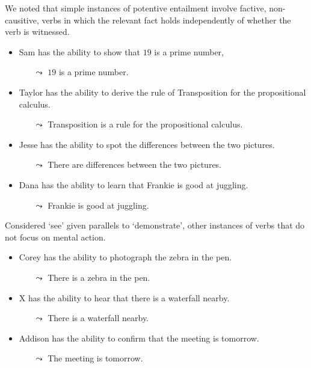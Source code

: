 \begin{note}[Examples]
  We noted that simple instances of potentive entailment involve factive, non-causitive, verbs in which the relevant fact holds independently of whether the verb is witnessed.
  \begin{itemize}
  \item Sam has the ability to show that \(19\) is a prime number,
    \begin{itemize}
    \item[\(\leadsto\)] \(19\) is a prime number.
    \end{itemize}
  \item Taylor has the ability to derive the rule of Transposition for the propositional calculus.
     \begin{itemize}
    \item[\(\leadsto\)] Transposition is a rule for the propositional calculus.
    \end{itemize}
  \item Jesse has the ability to spot the differences between the two pictures.
     \begin{itemize}
    \item[\(\leadsto\)] There are differences between the two pictures.
    \end{itemize}
  \item Dana has the ability to learn that Frankie is good at juggling.
     \begin{itemize}
    \item[\(\leadsto\)] Frankie is good at juggling.
    \end{itemize}
  \end{itemize}

  Considered `see' given parallels to `demonstrate', other instances of verbs that do not focus on mental action.
  \begin{itemize}
  \item Corey has the ability to photograph the zebra in the pen.
     \begin{itemize}
    \item[\(\leadsto\)] There is a zebra in the pen.
    \end{itemize}
  \item X has the ability to hear that there is a waterfall nearby.
     \begin{itemize}
    \item[\(\leadsto\)] There is a waterfall nearby.
    \end{itemize}
  \item Addison has the ability to confirm that the meeting is tomorrow.
    \begin{itemize}
    \item[\(\leadsto\)] The meeting is tomorrow.
    \end{itemize}
  \end{itemize}
\end{note}

